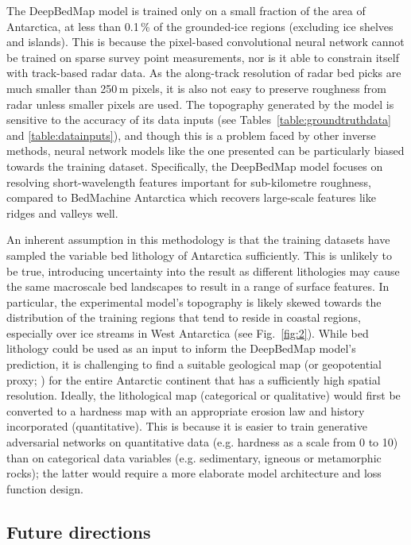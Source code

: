 The DeepBedMap model is trained only on a small fraction of the area of Antarctica, at less than 0.1\,{\%} of the grounded-ice regions (excluding ice shelves and islands).
This is because the pixel-based convolutional neural network cannot be trained on sparse survey point measurements, nor is it able to constrain itself with track-based radar data.
As the along-track resolution of radar bed picks are much smaller than 250\,\unit{m} pixels, it is also not easy to preserve roughness from radar unless smaller pixels are used.
The topography generated by the model is sensitive to the accuracy of its data inputs (see Tables~\ref{table:groundtruthdata} and \ref{table:datainputs}), and though this is a problem faced by other inverse methods, neural network models like the one presented can be particularly biased towards the training dataset.
Specifically, the DeepBedMap model focuses on resolving short-wavelength features important for sub-kilometre roughness, compared to BedMachine Antarctica \citep{MorlighemDeepglacialtroughs2019} which recovers large-scale features like ridges and valleys well.

An inherent assumption in this methodology is that the training datasets have sampled the variable bed lithology of Antarctica \citep{CoxGeoMAPdatasetAntarctic2018} sufficiently.
This is unlikely to be true, introducing uncertainty into the result as different lithologies may cause the same macroscale bed landscapes to result in a range of surface features.
In particular, the experimental model's topography is likely skewed towards the distribution of the training regions that tend to reside in coastal regions, especially over ice streams in West Antarctica (see Fig.~\ref{fig:2}).
While bed lithology could be used as an input to inform the DeepBedMap model's prediction, it is challenging to find a suitable geological map (or geopotential proxy; \citealp[see e.g.][]{AitkensubglacialgeologyWilkes2014,CoxGeoMAPdatasetAntarctic2018}) for the entire Antarctic continent that has a sufficiently high spatial resolution.
Ideally, the lithological map (categorical or qualitative) would first be converted to a hardness map with an appropriate erosion law and history incorporated (quantitative).
This is because it is easier to train generative adversarial networks on quantitative data (e.g. hardness as a scale from 0 to 10) than on categorical data variables (e.g. sedimentary, igneous or metamorphic rocks); the latter would require a more elaborate model architecture and loss function design.

\subsection{Future directions} \label{section:futuredirections}


